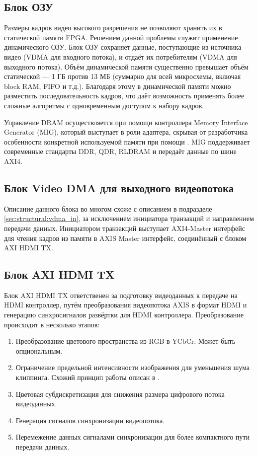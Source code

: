 \subsection{Блок ОЗУ}
\label{sec:structural:ram}
Размеры кадров видео высокого разрешения не позволяют хранить их в статической памяти FPGA. Решением данной проблемы
служит применение динамического ОЗУ. Блок ОЗУ сохраняет данные, поступающие из источника видео (VDMA для входного потока), и отдаёт
их потребителям (VDMA для выходного потока). Объём динамической памяти существенно превышает объём статической ---
1 ГБ против 13 МБ (суммарно для всей микросхемы, включая block RAM, FIFO и т.д.). Благодаря этому в динамической памяти можно разместить
последовательность кадров, что даёт возможность применять более сложные алгоритмы с одновременным доступом к набору кадров.

Управление DRAM осуществляется при помощи контроллера Memory Interface Generator (MIG), который выступает в роли адаптера, скрывая
от разработчика особенности конкретной используемой памяти при помощи . MIG поддерживает современные
стандарты DDR, QDR, RLDRAM и передаёт данные по шине AXI4.

\subsection{Блок Video DMA для выходного видеопотока}
\label{sec:structural:vdma_out}
Описание данного блока во многом схоже с описанием в подразделе \ref{sec:structural:vdma_in},
за исключением инициатора транзакций и направлением передачи данных. Инициатором транзакций выступает
AXI4-Master интерфейс для чтения кадров из памяти в AXIS Master интерфейс, соединённый с блоком AXI HDMI TX.

\subsection{Блок AXI HDMI TX}
\label{sec:structural:axi_hdmi_tx}
Блок AXI HDMI TX ответственен за подготовку видеоданных к передаче на HDMI контроллер, путём
преобразования видеопотока AXIS в формат HDMI и генерацию синхросигналов развёртки для HDMI контроллера.
Преобразование происходит в несколько этапов:
\begin{enumerate}[label={\arabic*}]
  \item Преобразование цветового пространства из RGB в YCbCr. Может быть опциональным.
  \item Ограничение предельной интенсивности изображения для уменьшения шума клиппинга.
    Схожий принцип работы описан в \cite{ycbcr_to_rgb_converter}.
  \item Цветовая субдискретизация для снижения размера цифрового потока видеоданных.
  \item Генерация сигналов синхронизации видеопотока.
  \item Перемежение данных сигналами синхронизации для более компактного пути передачи данных.
  \end{enumerate}

